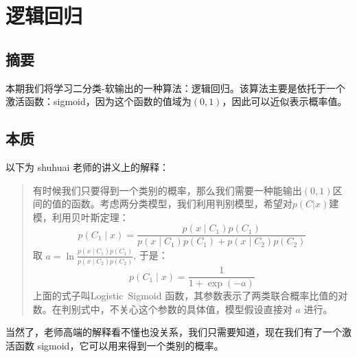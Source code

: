 \documentclass{report}
\begin{document}
\chapter{逻辑回归}
\section{摘要}
本期我们将学习二分类-软输出的一种算法：逻辑回归。该算法主要是依托于一个激活函数：sigmoid，因为这个函数的值域为$(0, 1)$，因此可以近似表示概率值。
\section{本质}
以下为 shuhuai 老师的讲义上的解释：
\begin{quotation}
	有时候我们只要得到一个类别的概率，那么我们需要一种能输出$(0, 1)$区间的值的函数。考虑两分类模型，我们利用判别模型，希望对$p(C|x)$建模，利用贝叶斯定理：
$$
p\left(C_{1} \mid x\right)=\frac{p\left(x \mid C_{1}\right) p\left(C_{1}\right)}{p\left(x \mid C_{1}\right) p\left(C_{1}\right)+p\left(x \mid C_{2}\right) p\left(C_{2}\right)}
$$
取 $a=\ln \frac{p\left(x \mid C_{1}\right) p\left(C_{1}\right)}{p\left(x \mid C_{2}\right) p\left(C_{2}\right)}$, 于是：
$$
p\left(C_{1} \mid x\right)=\frac{1}{1+\exp (-a)}
$$
上面的式子叫Logistic\ Sigmoid 函数，其参数表示了两类联合概率比值的对数。在判别式中，不关心这个参数的具体值，模型假设直接对 $a$ 进行。
\end{quotation}
当然了，老师高端的解释看不懂也没关系，我们只需要知道，现在我们有了一个激活函数 sigmoid，它可以用来得到一个类别的概率。
\end{document}
